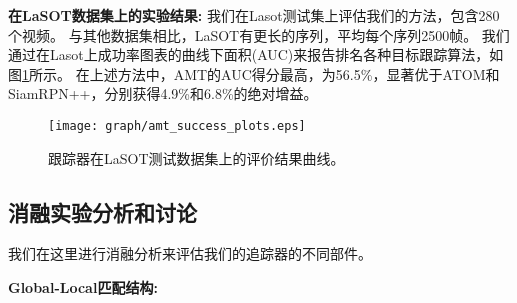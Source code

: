 \documentclass[promaster]{thesis-uestc}
\begin{document}
\begin{table}
    \caption{根据重叠阈值0.5和0.75处的平均重叠(AO)，成功率（SR）在Got10k测试集进行的最新比较。
     }
    \begin{center}
    \end{center}
    
    \label{t3}
\end{table}

\textbf{在LaSOT数据集上的实验结果:}
我们在Lasot测试集上评估我们的方法，包含280个视频。
与其他数据集相比，LaSOT有更长的序列，平均每个序列2500帧。
我们通过在Lasot上成功率图表的曲线下面积(AUC)来报告排名各种目标跟踪算法，如图\ref{lasot}所示。
在上述方法中，AMT的AUC得分最高，为56.5\%，显著优于ATOM和SiamRPN++，分别获得4.9\%和6.8\%的绝对增益。

\begin{figure}[t]
    \begin{center}
    \texttt{[image: graph/amt\_success\_plots.eps]}
    \end{center}
       \caption{跟踪器在LaSOT测试数据集上的评价结果曲线。}
    \label{lasot}
\end{figure}



\subsection{消融实验分析和讨论}
我们在这里进行消融分析来评估我们的追踪器的不同部件。

\noindent
\textbf{Global-Local匹配结构:}
\end{document}
